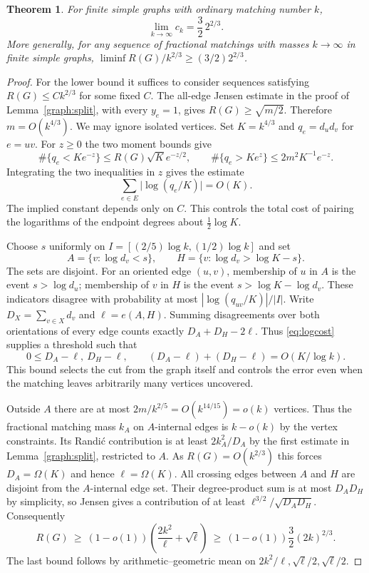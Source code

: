 \documentclass[11pt]{article}
\newtheorem{theorem}{Theorem}[section]
\theoremstyle{remark}\newtheorem{remark}[theorem]{Remark}
\begin{document}
\begin{theorem}\label{graph:limit}
For finite simple graphs with ordinary matching number $k$,
\[
              \lim_{k\to\infty}c_k=\frac32\,2^{2/3}.
\]
More generally, for any sequence of fractional matchings with
masses $k\to\infty$ in finite simple graphs,
$\liminf R(G)/k^{2/3}\ge (3/2)2^{2/3}$.
\end{theorem}
\begin{proof}
For the lower bound it suffices to consider sequences satisfying
$R(G)\le Ck^{2/3}$ for some fixed $C$. The all-edge Jensen estimate
in the proof of Lemma~\ref{graph:split}, with every $y_e=1$, gives
$R(G)\ge\sqrt{m/2}$. Therefore $m=O(k^{4/3})$. We may ignore isolated
vertices. Set $K=k^{4/3}$ and $q_e=d_ud_v$ for $e=uv$.
For $z\ge0$ the two moment bounds give
\[
 \#\{q_e<Ke^{-z}\}\le R(G)\sqrt K e^{-z/2},\qquad
 \#\{q_e>Ke^{z}\}\le 2m^2 K^{-1} e^{-z}.
\]
Integrating the two inequalities in $z$ gives the estimate
\begin{equation}\label{eq:logcost}
       \sum_{e\in E}\big|\log(q_e/K)\big|=O(K).
\end{equation}
The implied constant depends only on $C$. This controls the total
cost of pairing the logarithms of the endpoint degrees about
$\tfrac12\log K$.

Choose $s$ uniformly on $I=[(2/5)\log k,(1/2)\log k]$ and set
\[
 A=\{v:\log d_v<s\},\qquad H=\{v:\log d_v>\log K-s\}.
\]
The sets are disjoint. For an oriented edge $(u,v)$, membership of
$u$ in $A$ is the event $s>\log d_u$; membership of $v$ in $H$ is the
event $s>\log K-\log d_v$. These indicators disagree with probability
at most $|\log(q_{uv}/K)|/|I|$. Write $D_X=\sum_{v\in X}d_v$ and
$\ell=e(A,H)$. Summing disagreements over both orientations of every
edge counts exactly $D_A+D_H-2\ell$. Thus \eqref{eq:logcost} supplies
a threshold such that
\begin{equation}\label{eq:cuterror}
  0\le D_A-\ell,\ D_H-\ell,\qquad
  (D_A-\ell)+(D_H-\ell)=O(K/\log k).
\end{equation}
This bound selects the cut from the graph itself and controls the error
even when the matching leaves arbitrarily many vertices uncovered.

Outside $A$ there are at most $2m/k^{2/5}=O(k^{14/15})=o(k)$ vertices.
Thus the fractional matching mass $k_A$ on $A$-internal edges is
$k-o(k)$ by the vertex constraints. Its Randi\'c contribution is
at least $2k_A^2/D_A$ by the first estimate in
Lemma~\ref{graph:split}, restricted to $A$. As $R(G)=O(k^{2/3})$ this
forces $D_A=\Omega(K)$ and hence $\ell=\Omega(K)$.
All crossing edges between $A$ and $H$ are disjoint from the
$A$-internal edge set. Their degree-product sum is at most $D_A D_H$
by simplicity, so Jensen gives a contribution of at least
$\ell^{3/2}/\sqrt{D_A D_H}$. Consequently
\[
 R(G)\ \ge\ (1-o(1))
 \left(\frac{2k^2}{\ell}+\sqrt{\ell}\right)
 \ \ge\ (1-o(1))\frac32(2k)^{2/3}.
\]
The last bound follows by arithmetic--geometric mean on
$2k^2/\ell,\sqrt{\ell}/2,\sqrt{\ell}/2$.


\end{proof}
\end{document}
